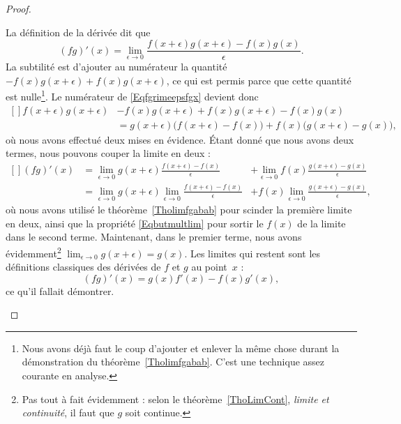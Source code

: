 \begin{proof}
\begin{subproof}
            La définition de la dérivée dit que
            \begin{equation}        \label{Eqfgrimeepsfgx}
                (fg)'(x)=\lim_{\epsilon\to 0}\frac{f(x+\epsilon)g(x+\epsilon)-f(x)g(x)}{\epsilon}.
            \end{equation}
            La subtilité est d'ajouter au numérateur la quantité $-f(x)g(x+\epsilon)+f(x)g(x+\epsilon)$, ce qui est permis parce que cette quantité est nulle\footnote{Nous avons déjà faut le coup d'ajouter et enlever la même chose durant la démonstration du théorème~\ref{Tholimfgabab}. C'est une technique assez courante en analyse.}. Le numérateur de \eqref{Eqfgrimeepsfgx} devient donc
            \begin{equation}
                \begin{aligned}[]
            f(x+\epsilon)g(x+\epsilon)&-f(x)g(x+\epsilon)+f(x)g(x+\epsilon)-f(x)g(x) \\
                        &= g(x+\epsilon)\big( f(x+\epsilon)-f(x) \big)+f(x)\big( g(x+\epsilon)-g(x) \big),
                \end{aligned}
            \end{equation}
            où nous avons effectué deux mises en évidence. Étant donné que nous avons deux termes, nous pouvons couper la limite en deux :
            \begin{equation}
                \begin{aligned}[]
                    (fg)'(x)    &=\lim_{\epsilon\to 0}g(x+\epsilon)\frac{ f(x+\epsilon)-f(x) }{\epsilon}            &+\lim_{\epsilon\to 0}f(x)\frac{ g(x+\epsilon)-g(x) }{\epsilon}\\
                            &=\lim_{\epsilon\to 0}g(x+\epsilon)\lim_{\epsilon\to 0}\frac{ f(x+\epsilon)-f(x) }{\epsilon}    &+f(x)\lim_{\epsilon\to 0}\frac{ g(x+\epsilon)-g(x) }{\epsilon},
                \end{aligned}
            \end{equation}
            où nous avons utilisé le théorème~\ref{Tholimfgabab} pour scinder la première limite en deux, ainsi que la propriété \eqref{Eqbutmultlim} pour sortir le $f(x)$ de la limite dans le second terme. Maintenant, dans le premier terme, nous avons évidemment\footnote{Pas tout à fait évidemment : selon le théorème~\ref{ThoLimCont}, \emph{limite et continuité}, il faut que $g$ soit continue.} $\lim_{\epsilon\to 0}g(x+\epsilon)=g(x)$. Les limites qui restent sont les définitions classiques des dérivées de $f$ et $g$ au point~$x$ :
            \begin{equation}
                (fg)'(x)=g(x)f'(x)-f(x)g'(x),
            \end{equation}
            ce qu'il fallait démontrer.


\end{subproof}
\end{proof}
